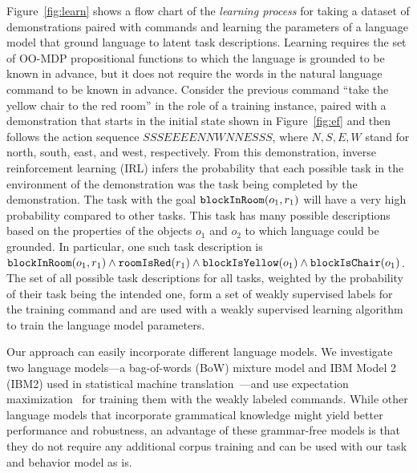 \documentclass[conference]{IEEEtran}
\begin{document}
Figure~\ref{fig:learn} shows a flow chart of the \emph{learning process} for taking a dataset of demonstrations paired with commands and learning the parameters of a language model that ground language to latent task descriptions. Learning requires the set of OO-MDP propositional functions to which the language is grounded to be known in advance, but it does not require the words in the natural language command to be known in advance. Consider the previous command ``take the yellow chair to the red room'' in the role of a training instance, paired with a demonstration that starts in the initial state shown in Figure~\ref{fig:ef} and then follows the action sequence $SSSEEEENNWNNESSS$, where $N, S, E, W$ stand for north, south, east, and west, respectively. From this demonstration, inverse reinforcement learning (IRL) infers the probability that each possible task in the environment of the demonstration was the task being completed by the demonstration. The task with the goal ${\tt blockInRoom}(o_1, r_1)$ will have a very high probability compared to other tasks. This task has many possible descriptions based on the properties of the objects $o_1$ and $o_2$ to which language could be grounded. In particular, one such task description is ${\tt blockInRoom}(o_1, r_1) \land {\tt roomIsRed}(r_1) \land {\tt blockIsYellow}(o_1) \land {\tt blockIsChair}(o_1)$. The set of all possible task descriptions for all tasks, weighted by the probability of their task being the intended one, form a set of weakly supervised labels for the training command and are used with a weakly supervised learning algorithm to train the language model parameters.

Our approach can easily incorporate different language models. We investigate two language models---a bag-of-words (BoW) mixture model and
IBM Model 2 (IBM2) used in statistical machine translation~\cite{brown90,brown93}---and use expectation maximization~\cite{dempster77} for training them with the weakly labeled commands. While other language
models that incorporate grammatical knowledge might yield better
performance and robustness, an advantage of these grammar-free models
is that they do not require any additional corpus training and can be
used with our task and behavior model as is. 

\end{document}
